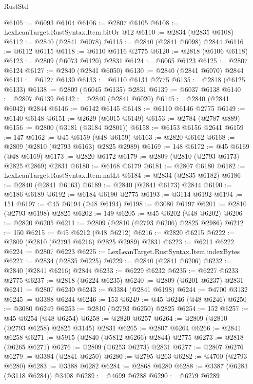 \begin{lexlean}{RustStd}
\begin{coremodule}
@6105 := @6093 @6104
@6106 := @2807 @6105
@6108 := LexLeanTarget.RustSyntax.Item.bitOr @12
@6110 := @2834 (@2835 @6108)
@6112 := @2840 (@2841 @6078)
@6115 := @2840 (@2841 @6098) @2844
@6116 := @6112 @6115
@6118 := @6110 @6116 @2775
@6120 := @2818 (@6106 @6118)
@6123 := @2809 (@6073 @6120) @2831
@6124 := @6065 @6123
@6125 := @2807 @6124
@6127 := @2840 (@2841 @6050)
@6130 := @2840 (@2841 @6070) @2844
@6131 := @6127 @6130
@6133 := @6110 @6131 @2775
@6135 := @2818 (@6125 @6133)
@6138 := @2809 (@6045 @6135) @2831
@6139 := @6037 @6138
@6140 := @2807 @6139
@6142 := @2840 (@2841 @6020)
@6145 := @2840 (@2841 @6042) @2844
@6146 := @6142 @6145
@6148 := @6110 @6146 @2775
@6149 := @6140 @6148
@6151 := @2629 (@6015 @6149)
@6153 := @2784 (@2787 @889)
@6156 := @2800 (@3181 (@3184 @2801))
@6158 := @6153 @6156 @2641
@6159 := 147
@6162 := @45 @6159 (@48 @6159)
@6163 := @2820 @6162
@6168 := @2809 (@2810 (@2793 @6163) @2825 @2989)
@6169 := 148
@6172 := @45 @6169 (@48 @6169)
@6173 := @2820 @6172
@6179 := @2809 (@2810 (@2793 @6173) @2825 @2869) @2831
@6180 := @6168 @6179
@6181 := @2807 @6180
@6182 := LexLeanTarget.RustSyntax.Item.natLt
@6184 := @2834 (@2835 @6182)
@6186 := @2840 (@2841 @6163)
@6189 := @2840 (@2841 @6173) @2844
@6190 := @6186 @6189
@6192 := @6184 @6190 @2775
@6193 := @3114 @6192
@6194 := 151
@6197 := @45 @6194 (@48 @6194)
@6198 := @3080 @6197
@6201 := @2810 (@2793 @6198) @2825
@6202 := 149
@6205 := @45 @6202 (@48 @6202)
@6206 := @2820 @6205
@6211 := @2809 (@2810 (@2793 @6206) @2825 @2986)
@6212 := 150
@6215 := @45 @6212 (@48 @6212)
@6216 := @2820 @6215
@6222 := @2809 (@2810 (@2793 @6216) @2825 @2989) @2831
@6223 := @6211 @6222
@6224 := @2807 @6223
@6225 := LexLeanTarget.RustSyntax.Item.indexBytes
@6227 := @2834 (@2835 @6225)
@6229 := @2840 (@2841 @6206)
@6232 := @2840 (@2841 @6216) @2844
@6233 := @6229 @6232
@6235 := @6227 @6233 @2775
@6237 := @2818 (@6224 @6235)
@6240 := @2809 (@6201 @6237) @2831
@6241 := @2807 @6240
@6243 := @3384 (@2841 @6198)
@6244 := @4700 @3132
@6245 := @3388 @6244
@6246 := 153
@6249 := @45 @6246 (@48 @6246)
@6250 := @3080 @6249
@6253 := @2810 (@2793 @6250) @2825
@6254 := 152
@6257 := @45 @6254 (@48 @6254)
@6258 := @2820 @6257
@6264 := @2809 (@2810 (@2793 @6258) @2825 @3145) @2831
@6265 := @2807 @6264
@6266 := @2841 @6258
@6271 := @5915 (@2840 (@5812 @6266) @2844) @2775
@6273 := @2818 (@6265 @6271)
@6276 := @2809 (@6253 @6273) @2831
@6277 := @2807 @6276
@6279 := @3384 (@2841 @6250)
@6280 := @2795 @263
@6282 := @4700 (@2793 @6280)
@6283 := @3388 @6282
@6284 := @2868 @6280
@6288 := @3387 (@6283 (@3118 @6284)) @3408
@6289 := @4699 @6288
@6290 := @6279 @6289

\end{coremodule}
\end{lexlean}
